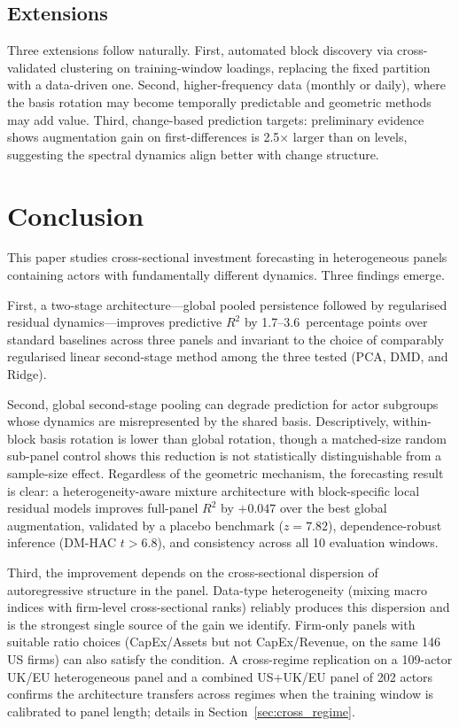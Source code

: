 \documentclass[11pt,a4paper]{article}
\begin{document}
\subsection{Extensions}

Three extensions follow naturally. First, automated block discovery via cross-validated clustering on training-window loadings, replacing the fixed partition with a data-driven one. Second, higher-frequency data (monthly or daily), where the basis rotation may become temporally predictable and geometric methods may add value. Third, change-based prediction targets: preliminary evidence shows augmentation gain on first-differences is 2.5$\times$ larger than on levels, suggesting the spectral dynamics align better with change structure.


\section{Conclusion}
\label{sec:conclusion}

This paper studies cross-sectional investment forecasting in heterogeneous panels containing actors with fundamentally different dynamics. Three findings emerge.

First, a two-stage architecture---global pooled persistence followed by regularised residual dynamics---improves predictive $R^2$ by 1.7--3.6~percentage points over standard baselines across three panels and invariant to the choice of comparably regularised linear second-stage method among the three tested (PCA, DMD, and Ridge).

Second, global second-stage pooling can degrade prediction for actor subgroups whose dynamics are misrepresented by the shared basis. Descriptively, within-block basis rotation is lower than global rotation, though a matched-size random sub-panel control shows this reduction is not statistically distinguishable from a sample-size effect. Regardless of the geometric mechanism, the forecasting result is clear: a heterogeneity-aware mixture architecture with block-specific local residual models improves full-panel $R^2$ by $+0.047$ over the best global augmentation, validated by a placebo benchmark ($z = 7.82$), dependence-robust inference (DM-HAC $t > 6.8$), and consistency across all 10 evaluation windows.

Third, the improvement depends on the cross-sectional dispersion of autoregressive structure in the panel. Data-type heterogeneity (mixing macro indices with firm-level cross-sectional ranks) reliably produces this dispersion and is the strongest single source of the gain we identify. Firm-only panels with suitable ratio choices (CapEx/Assets but not CapEx/Revenue, on the same 146 US firms) can also satisfy the condition. A cross-regime replication on a 109-actor UK/EU heterogeneous panel and a combined US+UK/EU panel of 202 actors confirms the architecture transfers across regimes when the training window is calibrated to panel length; details in Section~\ref{sec:cross_regime}.
\end{document}
